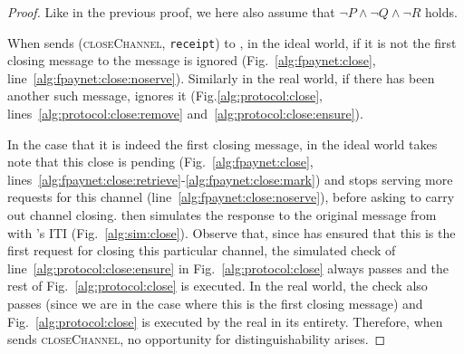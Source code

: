 \begin{proof}
  Like in the previous proof, we here also assume that $\neg P \wedge \neg Q
  \wedge \neg R$ holds.

  When \environment{} sends (\textsc{closeChannel}, \texttt{receipt}) to \alice,
  in the ideal world, if it is not the first closing message to \alice{} the
  message is ignored (Fig.~\ref{alg:fpaynet:close},
  line~\ref{alg:fpaynet:close:noserve}). Similarly in the real world, if there
  has been another such message, \alice{} ignores it
  (Fig.\ref{alg:protocol:close}, lines~\ref{alg:protocol:close:remove}
  and~\ref{alg:protocol:close:ensure}).

  In the case that it is indeed the first closing message, in the ideal world
  \fpaynet{} takes note that this close is pending
  (Fig.~\ref{alg:fpaynet:close},
  lines~\ref{alg:fpaynet:close:retrieve}-\ref{alg:fpaynet:close:mark}) and stops
  serving more requests for this channel (line~\ref{alg:fpaynet:close:noserve}),
  before asking \simulator{} to carry out channel closing. \simulator{} then
  simulates the response to the original message from \environment{} with
  \alice's ITI (Fig.~\ref{alg:sim:close}). Observe that, since \fpaynet{} has
  ensured that this is the first request for closing this particular channel,
  the simulated check of line~\ref{alg:protocol:close:ensure} in
  Fig.~\ref{alg:protocol:close} always passes and the rest of
  Fig.~\ref{alg:protocol:close} is executed. In the real world, the check also
  passes (since we are in the case where this is the first closing message) and
  Fig.~\ref{alg:protocol:close} is executed by the real \alice{} in its
  entirety. Therefore, when \environment{} sends \textsc{closeChannel}, no
  opportunity for distinguishability arises.


\end{proof}
